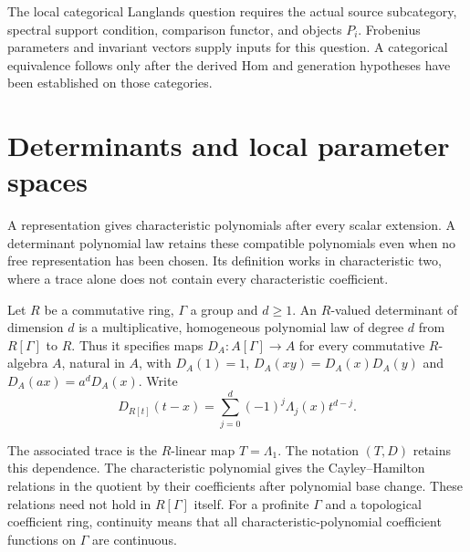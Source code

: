 The local categorical Langlands question requires the actual source
subcategory, spectral support condition, comparison functor, and
objects $P_i$. Frobenius parameters and invariant vectors supply inputs
for this question. A categorical
equivalence follows only after the derived Hom and generation
hypotheses have been established on those categories.

\section{Determinants and local parameter spaces}
\label{v4-arith:ic:determinants}

A representation gives characteristic polynomials after every scalar
extension. A determinant polynomial law retains these compatible
polynomials even when no free representation has been chosen.
Its definition works in characteristic two, where a trace alone
does not contain every characteristic coefficient.


\begin{definition}
\label{v4-arith:ic:w5-h:def:chenevier-det-trace}
Let $R$ be a commutative ring, $\Gamma$ a group and $d\geq1$.
An $R$-valued determinant of dimension $d$ is a multiplicative,
homogeneous polynomial law of degree $d$ from $R[\Gamma]$ to $R$.
Thus it specifies maps $D_A:A[\Gamma]\to A$ for every commutative
$R$-algebra $A$, natural in $A$, with
$D_A(1)=1$, $D_A(xy)=D_A(x)D_A(y)$ and
$D_A(ax)=a^dD_A(x)$. Write
\[
 D_{R[t]}(t-x)=\sum_{j=0}^d(-1)^j\Lambda_j(x)t^{d-j}.
\]

The associated trace is the $R$-linear map $T=\Lambda_1$. The
notation $(T,D)$ retains this dependence. The characteristic
polynomial gives the Cayley--Hamilton relations in the quotient
by their coefficients after polynomial base change. These relations
need not hold in $R[\Gamma]$ itself.
For a profinite $\Gamma$ and a topological coefficient ring,
continuity means that all characteristic-polynomial coefficient
functions on $\Gamma$ are continuous.
\end{definition}

